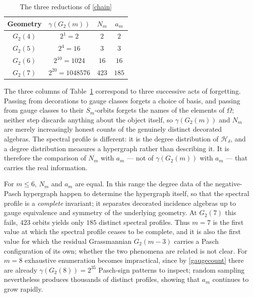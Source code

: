\documentclass[times,11pt,reqno]{amsproc}
\theoremstyle{definition}
\numberwithin{equation}{section}
\begin{document}
\begin{table}[h]
\centering
\begin{tabular}{c|ccc}
Geometry &
$\gamma(G_2(m))$ &
$N_m$ &
$a_m$
\\
\midrule
$G_2(4)$ & $2^{1}=2$ & $2$ & $2$ \\
$G_2(5)$ & $2^{4}=16$ & $3$ & $3$ \\
$G_2(6)$ & $2^{10}=1024$ & $16$ & $16$ \\
$G_2(7)$ & $2^{20}=1048576$ & $423$ & $185$
\end{tabular}
\smallskip
\caption{The three reductions of \eqref{chain}
}
\label{tab:profilecounts}
\end{table}


The three columns of Table~\ref{tab:profilecounts} correspond to three
successive acts of forgetting. Passing from decorations to gauge classes
forgets a choice of basis, and passing from gauge classes to their
$S_m$-orbits forgets the names of the elements of $\Omega$; neither step
discards anything about the object itself, so $\gamma(G_2(m))$ and $N_m$
are merely increasingly honest counts of the genuinely distinct decorated
algebras. The spectral profile is different: it is the degree
distribution of $\mathscr H_\delta$, and a degree distribution measures a
hypergraph rather than describing it. It is therefore the comparison of
$N_m$ with $a_m$ --- not of $\gamma(G_2(m))$ with $a_m$ --- that carries
the real information.

For $m \leq 6$, $N_m$ and $a_m$ are equal. In this range the degree data of the
negative-Pasch hypergraph happen to determine the hypergraph itself, so
that the spectral profile is a \emph{complete} invariant; it separates
decorated incidence algebras up to gauge equivalence and symmetry of the
underlying geometry.
At $G_2(7)$ this fails, $423$ orbits yields only
$185$ distinct spectral profiles. Thus $m=7$ is the first value
at which the spectral profile ceases to be complete, and it is also the
first value for which the residual Grassmannian $G_2(m-3)$ carries a Pasch
configuration of its own; whether the two phenomena are related is not
clear. For $m=8$ exhaustive enumeration becomes impractical, since
by \eqref{gaugecount} there are already $\gamma(G_2(8))=2^{35}$ Pasch-sign
patterns to inspect; random sampling nevertheless produces thousands of
distinct profiles, showing that $a_m$ continues to grow rapidly.
\end{document}
